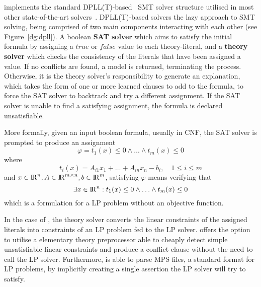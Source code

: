 \documentclass[runningheads]{llncs}
\begin{document}
\dlinear implements the standard DPLL(T)-based~\cite{ref:dpll-t} SMT solver structure utilised in most other state-of-the-art solvers~\cite{ref:z3-dpll-t}.
DPLL(T)-based solvers the lazy approach to SMT solving, being comprised of two main components interacting with each other (see Figure~\ref{dg:dpll}).
A boolean \textbf{SAT solver} which aims to satisfy the initial formula by assigning a $true$ or $false$ value to each theory-literal, and a \textbf{theory solver} which checks the consistency of the literals that have been assigned a value.
If no conflicts are found, a model is returned, terminating the process.
Otherwise, it is the theory solver's responsibility to generate an explanation, which takes the form of one or more learned clauses to add to the formula, to force the SAT solver to backtrack and try a different assignment.
If the SAT solver is unable to find a satisfying assignment, the formula is declared unsatisfiable.

More formally, given an input boolean formula, usually in CNF, the SAT solver is prompted to produce an assignment
\begin{equation} %
    \label{eq:smt-formula}
    \varphi = t_1(x) \le 0 \wedge \ldots \wedge t_m (x) \le 0
\end{equation}
where
\begin{equation*}
    t_i(x) = A_{i1}x_1 + \ldots + A_{in}x_n - b_i, \quad 1 \le i \le m
\end{equation*}
and $x \in {\rm I\!R}^n, A \in {\rm I\!R}^{m \times n}, b \in {\rm I\!R}^m$, satisfying $\varphi$ means verifying that
\begin{equation*}
    \exists x \in {\rm I\!R}^n : t_1(x) \le 0 \wedge \ldots \wedge t_m(x) \le 0
\end{equation*}
which is a formulation for a LP problem without an objective function.

In the case of \dlinear, the theory solver converts the linear constraints of the assigned literals into constraints of an LP problem fed to the LP solver.
\dlinear offers the option to utilise a elementary theory preprocessor able to cheaply detect simple unsatisfiable linear constraints and produce a conflict clause without the need to call the LP solver.
Furthermore, \dlinear is able to parse MPS files, a standard format for LP problems, by implicitly creating a single assertion the LP solver will try to satisfy.

\end{document}
